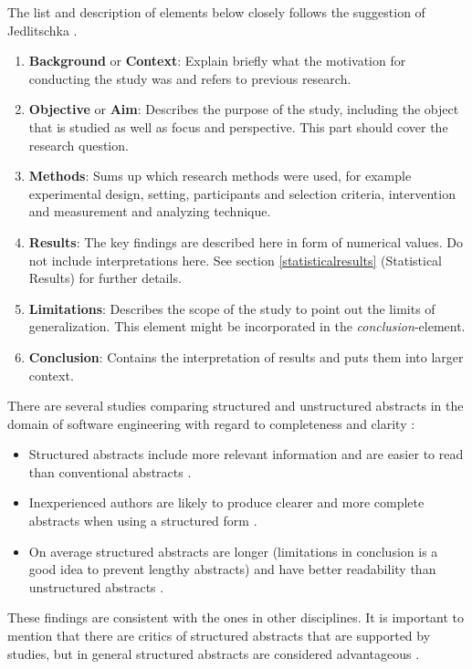 The list and description of elements below closely follows the suggestion of Jedlitschka \etal \cite{Jedlitschka2008}.
\begin{enumerate}
	\item \textbf{Background} or \textbf{Context}: Explain briefly what the motivation for conducting the study was and refers to previous research.
	\item \textbf{Objective} or \textbf{Aim}: Describes the purpose of the study, including the object that is studied as well as focus and perspective. This part should cover the research question.
	\item \textbf{Methods}: Sums up which research methods were used, for example experimental design, setting, participants and selection criteria, intervention and measurement and analyzing technique.
	\item \textbf{Results}: The key findings are described here in form of numerical values. Do not include interpretations here. See section \ref{statisticalresults} (Statistical Results) for further details.
	\item \textbf{Limitations}: Describes the scope  of the study to point out the limits of generalization. This element might be incorporated in the \emph{conclusion}-element.
	\item \textbf{Conclusion}:  Contains the interpretation of results and puts them into larger context.
\end{enumerate}

There are several studies comparing structured and unstructured abstracts in the domain of software engineering with regard to completeness and clarity :

\begin{itemize}
\item Structured abstracts include more relevant information and are easier to read than conventional abstracts \cite{Budgen2007,Budgen2008}.
\item Inexperienced authors are likely to produce clearer and more complete abstracts when using a structured form \cite{Budgen2011} .
\item On average structured abstracts are longer (limitations in conclusion is a good idea to prevent lengthy abstracts) and have better readability than unstructured abstracts \cite{KBO2008}.
\end{itemize}
	
These findings are consistent with the ones in other disciplines. It is important to mention that there are critics of structured abstracts that are supported by studies, but in general structured abstracts are considered advantageous \cite{hartley2004,hartley2014}.	

